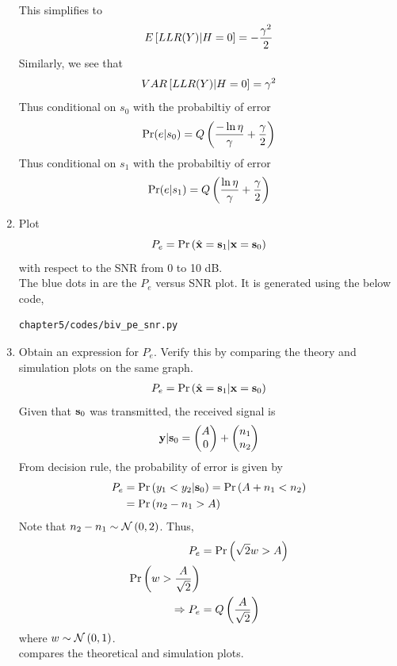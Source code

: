 \begin{enumerate}
\begin{align}
\end{align}
This simplifies to
\begin{align}
E{}\left[LLR(Y)|H=0\right] = -\frac{\gamma^2}{2}
\end{align} 
Similarly, we see that
\begin{align}
VAR{}\left[LLR(Y)|H=0\right] = \gamma^2
\end{align}
Thus conditional on $s_0$ with the probabiltiy of error 
\begin{align}
\Pr(e |s_0) = Q\left(\frac{-\ln{\eta}}{\gamma}+\frac{\gamma}{2}\right)
\end{align}
Thus conditional on $s_1$ with the probabiltiy of error 
\begin{align}
\Pr(e |s_1) = Q\left(\frac{\ln{\eta}}{\gamma}+\frac{\gamma}{2}\right)
\end{align}



%
\item
Plot 
\begin{equation} 
P_e = \Pr\left(\hat{\mathbf{x}} = \mathbf{s}_1|\mathbf{x} = \mathbf{s}_0\right)
\label{eq:prob_error_fsk}
\end{equation}
with respect to the SNR from 0 to 10 dB.\\
\solution The blue dots in  are the $P_e$ versus SNR plot. It is generated using the below code,
\begin{lstlisting}
chapter5/codes/biv_pe_snr.py
\end{lstlisting}
%
\item
Obtain an expression for $P_e$. Verify this by comparing the theory and simulation plots on the same graph.\\
\solution \begin{align}
    P_e = \Pr\left(\hat{\mathbf{x}} = \mathbf{s}_1|\mathbf{x} = \mathbf{s}_0\right)
    \end{align}
    Given that $\mathbf{s}_0$ was transmitted, the received signal is
    \begin{align}
    \mathbf{y}|\mathbf{s}_0 = \begin{pmatrix} A \\ 0 \end{pmatrix} + \begin{pmatrix} n_1 \\ n_2 \end{pmatrix}
    \end{align}
    From decision rule, the probability of error is given by 
    \begin{align}
    P_e &= \Pr\left(y_1 < y_2 |\mathbf{s}_0\right) = \Pr\left(A+n_1 < n_2\right)\\
    &= \Pr\left(n_2 - n_1 > A\right)
    \end{align}
    Note that $n_2 - n_1 \sim \mathcal{N}\left(0,2\right)$. Thus,
    \begin{align}
    P_e &= \Pr\left(\sqrt{2}w > A\right)\\
    \Pr\left(w > \dfrac{A}{\sqrt{2}}\right)\\
    \Rightarrow P_e &= Q\left(\frac{A}{\sqrt{2}}\right)
    \end{align}
    where $w \sim \mathcal{N}\left(0,1\right)$. \\
 compares the theoretical and simulation plots.


\end{enumerate}
